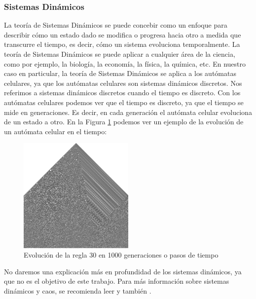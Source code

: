 \subsubsection{Sistemas Din\'amicos}
\label{sec:SistemasDinamicos}
    La teor\'ia de Sistemas Din\'amicos se puede concebir como un enfoque para describir c\'omo un estado dado se modifica o 
        progresa hacia otro a medida que transcurre el tiempo, es decir, c\'omo un sistema evoluciona temporalmente.
        La teor\'ia de Sistemas Din\'amicos se puede aplicar a cualquier \'area de la ciencia, como por ejemplo,
        la biolog\'ia, la econom\'ia, la f\'isica, la qu\'imica, etc. En nuestro caso en particular, la teor\'ia de
        Sistemas Din\'amicos se aplica a los aut\'omatas celulares, ya que los aut\'omatas celulares son sistemas
        din\'amicos discretos.
    \vskip 0.5cm
    Nos referimos a sistemas din\'amicos discretos cuando el tiempo es discreto. Con los aut\'omatas celulares
        podemos ver que el tiempo es discreto, ya que el tiempo se mide en generaciones. Es decir, en cada generaci\'on
        el aut\'omata celular evoluciona de un estado a otro. En la Figura \ref{fig:automataCelularEvolucion} podemos
        ver un ejemplo de la evoluci\'on de un aut\'omata celular en el tiempo:
        \begin{figure}[h]
            \centering
            \includegraphics[width=0.5\textwidth]{./images/marco_teorico/automatas_celulares/Regla30-1000Gen.png}
            \caption{Evoluci\'on de la regla 30 en 1000 generaciones o pasos de tiempo}
            \label{fig:automataCelularEvolucion}
        \end{figure}
    \vskip 0.5cm
    No daremos una explicaci\'on m\'as en profundidad de los sistemas din\'amicos, ya que no es el objetivo de este
        trabajo. Para m\'as informaci\'on sobre sistemas din\'amicos y caos, se recomienda leer \cite{Ott1993} y tambi\'en \cite{Luenberger1979}.
